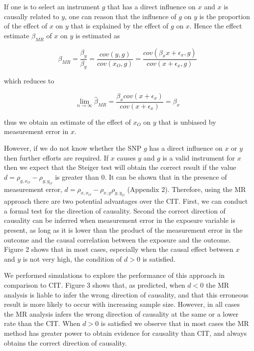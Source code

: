 \documentclass[]{article}
\begin{document}
If one is to select an instrument \(g\) that has a direct influence on
\(x\) and \(x\) is causally related to \(y\), one can reason that the
influence of \(g\) on \(y\) is the proportion of the effect of \(x\) on
\(y\) that is explained by the effect of \(g\) on \(x\). Hence the
effect estimate \(\beta_{MR}\) of \(x\) on \(y\) is estimated as

\[
\beta_{MR} = \frac{\beta_y}{\beta_g} = \frac{cov(y, g)}{cov(x_O,g)} = \frac{cov(\beta_x x + \epsilon_x, g)}{cov(x + \epsilon_x, g)}
\]

which reduces to

\[
\lim_{n \to \infty} \hat{\beta}_{MR} = \frac{\beta_x cov(x + \epsilon_x)}{cov(x + \epsilon_x)} = \beta_x
\]

thus we obtain an estimate of the effect of \(x_O\) on \(y\) that is
unbiased by measurement error in \(x\).

However, if we do not know whether the SNP \(g\) has a direct influence
on \(x\) or \(y\) then further efforts are required. If \(x\) causes
\(y\) and \(g\) is a valid instrument for \(x\) then we expect that the
Steiger test will obtain the correct result if the value
\(d = \rho_{g, x_O} - \rho_{g, y_O}\) is greater than 0. It can be shown
that in the presence of measurement error,
\(d = \rho_{x, x_O} - \rho_{x,y}\rho_{y,y_O}\) (Appendix 2). Therefore,
using the MR approach there are two potential advantages over the CIT.
First, we can conduct a formal test for the direction of causality.
Second the correct direction of causality can be inferred when
measurement error in the exposure variable is present, as long as it is
lower than the product of the measurement error in the outcome and the
causal correlation between the exposure and the outcome. Figure 2 shows
that in most cases, especially when the causal effect between \(x\) and
\(y\) is not very high, the condition of \(d > 0\) is satisfied.

We performed simulations to explore the performance of this approach in
comparison to CIT. Figure 3 shows that, as predicted, when \(d < 0\) the
MR analysis is liable to infer the wrong direction of causality, and
that this erroneous result is more likely to occur with increasing
sample size. However, in all cases the MR analysis infers the wrong
direction of causality at the same or a lower rate than the CIT. When
\(d > 0\) is satisfied we observe that in most cases the MR method has
greater power to obtain evidence for causality than CIT, and always
obtains the correct direction of causality.
\end{document}

